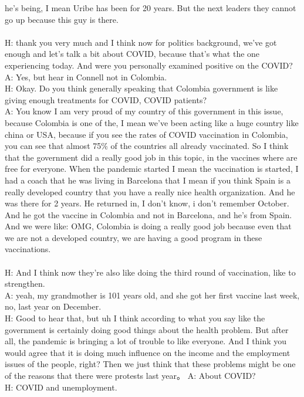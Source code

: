 \documentclass{phyasgn}\usepackage{nag}
\begin{document}
he's being, I mean Uribe has been for 20 years. But the next leaders they cannot go up because this guy is there.\\
\\
H: thank you very much and I think now for politics background, we've got enough and let's talk a bit about COVID, because that's what the one experiencing today. And were you personally examined positive on the COVID?\\
A: Yes, but hear in Connell not in Colombia. \\
H: Okay. Do you think generally speaking that Colombia government is like giving enough treatments for COVID, COVID patients?\\
A: You know I am very proud of my country of this government in this issue, because Colombia is one of the, I mean we've been acting like a huge country like china or USA, because if you see the rates of COVID vaccination in Colombia, you can see that almost 75\% of the countries all already vaccinated. So I think that the government did a really good job in this topic, in the vaccines where are free for everyone. When the pandemic started I mean the vaccination is started, I had a coach that he was living in Barcelona that I mean if you think Spain is a really developed country that you have a really nice health organization. And he was there for 2 years. He returned in, I don't know, i don't remember October. And he got the vaccine in Colombia and not in Barcelona, and he's from Spain. And we were like: OMG, Colombia is doing a really good job because even that we are not a developed country, we are having a good program in these vaccinations. \\
\\
H: And I think now they're also like doing the third round of vaccination, like to strengthen.\\
A: yeah, my grandmother is 101 years old, and she got her first vaccine last week, no, last year on December.\\
H: Good to hear that, but uh I think according to what you say like the government is certainly doing good things about the health problem. But after all, the pandemic is bringing a lot of trouble to like everyone. And I think you would agree that it is doing much influence on the income and the employment issues of the people, right? Then we just think that these problems might be one of the reasons that there were protests last year。
A: About COVID?\\
H: COVID and unemployment.\\
\end{document}
